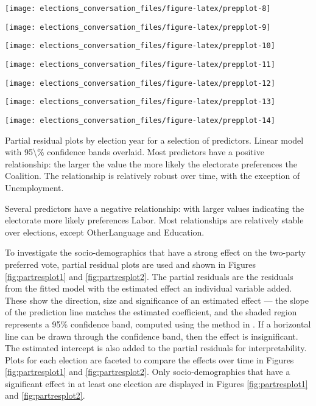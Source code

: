 \documentclass[11pt,a4paper,]{article}
\begin{document}
\begin{center}\texttt{[image: elections\_conversation\_files/figure-latex/prepplot-8]} \end{center}

\begin{center}\texttt{[image: elections\_conversation\_files/figure-latex/prepplot-9]} \end{center}

\begin{center}\texttt{[image: elections\_conversation\_files/figure-latex/prepplot-10]} \end{center}

\begin{center}\texttt{[image: elections\_conversation\_files/figure-latex/prepplot-11]} \end{center}

\begin{center}\texttt{[image: elections\_conversation\_files/figure-latex/prepplot-12]} \end{center}

\begin{center}\texttt{[image: elections\_conversation\_files/figure-latex/prepplot-13]} \end{center}

\begin{center}\texttt{[image: elections\_conversation\_files/figure-latex/prepplot-14]} \end{center}

Partial residual plots by election year for a selection of predictors. Linear model with 95\textbackslash{}\% confidence bands overlaid. Most predictors have a positive relationship: the larger the value the more likely the electorate preferences the Coalition. The relationship is relatively robust over time, with the exception of Unemployment.

Several predictors have a negative relationship: with larger values indicating the electorate more likely preferences Labor. Most relationships are relatively stable over elections, except OtherLanguage and Education.

To investigate the socio-demographics that have a strong effect on the two-party preferred vote, partial residual plots are used and shown in Figures \ref{fig:partresplot1} and \ref{fig:partresplot2}. The partial residuals are the residuals from the fitted model with the estimated effect an individual variable added. These show the direction, size and significance of an estimated effect --- the slope of the prediction line matches the estimated coefficient, and the shaded region represents a 95\% confidence band, computed using the method in \textcite{visreg}. If a horizontal line can be drawn through the confidence band, then the effect is insignificant. The estimated intercept is also added to the partial residuals for interpretability. Plots for each election are faceted to compare the effects over time in Figures \ref{fig:partresplot1} and \ref{fig:partresplot2}. Only socio-demographics that have a significant effect in at least one election are displayed in Figures \ref{fig:partresplot1} and \ref{fig:partresplot2}.
\end{document}
